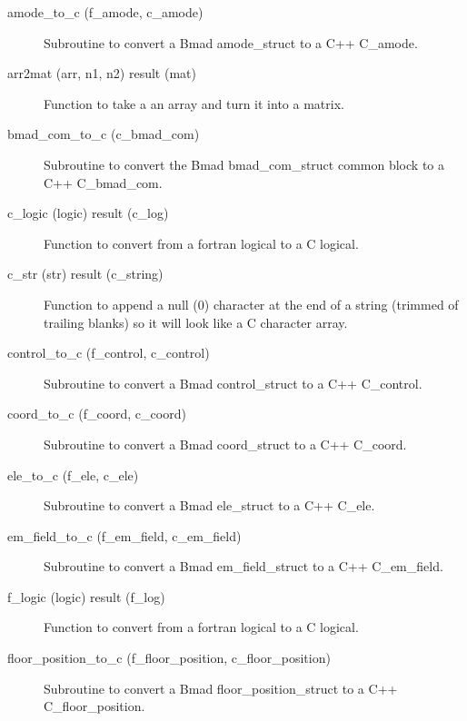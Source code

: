 \begin{description}

\item[amode_to_c (f_amode, c_amode)] \Newline 
Subroutine to convert a Bmad amode_struct to a C++ C_amode.

\item[arr2mat (arr, n1, n2) result (mat)] \Newline 
Function to take a an array and turn it into a matrix.

\item[bmad_com_to_c (c_bmad_com)] \Newline 
Subroutine to convert the Bmad bmad_com_struct common block to 
a C++ C_bmad_com.

\item[c_logic (logic) result (c_log)] \Newline 
Function to convert from a fortran logical to a C logical.

\item[c_str (str) result (c_string)] \Newline 
Function to append a null (0) character at the end of a string (trimmed
of trailing blanks) so it will look like a C character array. 

\item[control_to_c (f_control, c_control)] \Newline 
Subroutine to convert a Bmad control_struct to a C++ C_control.

\item[coord_to_c (f_coord, c_coord)] \Newline 
Subroutine to convert a Bmad coord_struct to a C++ C_coord.

\item[ele_to_c (f_ele, c_ele)] \Newline 
Subroutine to convert a Bmad ele_struct to a C++ C_ele.

\item[em_field_to_c (f_em_field, c_em_field)] \Newline 
Subroutine to convert a Bmad em_field_struct to a C++ C_em_field.

\item[f_logic (logic) result (f_log)] \Newline 
Function to convert from a fortran logical to a C logical.

\item[floor_position_to_c (f_floor_position, c_floor_position)] \Newline 
Subroutine to convert a Bmad floor_position_struct to a C++ C_floor_position.


\end{description}
